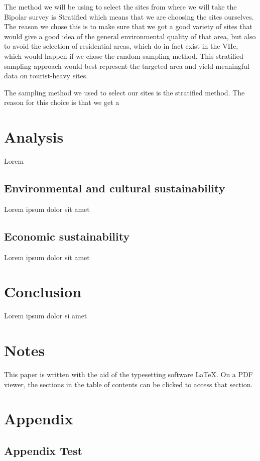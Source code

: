 \documentclass[11pt,letterpaper]{article}
\begin{document}
The method we will be using to select the sites from where we will take the Bipolar survey is Stratified which means that we are choosing the sites ourselves. The reason we chose this is to make sure that we got a good variety of sites that would give a good idea of the general environmental quality of that area, but also to avoid the selection of residential areas, which do in fact exist in the VIIe, which would happen if we chose the random sampling method. This stratified sampling approach would best represent the targeted area and yield meaningful data on tourist-heavy sites.

The sampling method we used to select our sites is the stratified method. The reason for this choice is that we get a


\section{Analysis}

Lorem

\subsection{Environmental and cultural sustainability}
Lorem ipsum dolor sit amet

\subsection{Economic sustainability}
Lorem ipsum dolor sit amet

\section{Conclusion}

Lorem ipsum dolor si amet

\newpage
{}


\section*{Notes}
\label{sec:notes}

This paper is written with the aid of the typesetting software \LaTeX. On a PDF viewer, the sections in the table of contents can be clicked to access that section.

\printbibliography

\appendix
\section{Appendix}
\label{app}

\subsection{Appendix Test}
\label{app:test}
\end{document}
